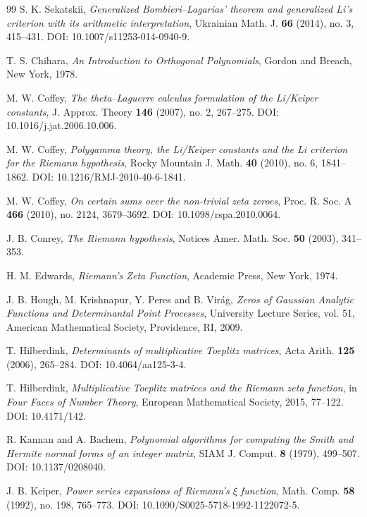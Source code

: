 \documentclass[11pt]{amsart}
\numberwithin{equation}{section}
\theoremstyle{plain}
\theoremstyle{definition}
\theoremstyle{remark}
\begin{document}
\begin{thebibliography}{99}
S. K. Sekatskii,
\emph{Generalized Bombieri--Lagarias' theorem and generalized Li's criterion with its arithmetic interpretation},
Ukrainian Math. J. \textbf{66} (2014), no. 3, 415--431.
DOI: 10.1007/s11253-014-0940-9.

T. S. Chihara,
\emph{An Introduction to Orthogonal Polynomials},
Gordon and Breach, New York, 1978.

M. W. Coffey,
\emph{The theta--Laguerre calculus formulation of the Li/Keiper constants},
J. Approx. Theory \textbf{146} (2007), no. 2, 267--275.
DOI: 10.1016/j.jat.2006.10.006.

M. W. Coffey,
\emph{Polygamma theory, the Li/Keiper constants and the Li criterion for the Riemann hypothesis},
Rocky Mountain J. Math. \textbf{40} (2010), no. 6, 1841--1862.
DOI: 10.1216/RMJ-2010-40-6-1841.

M. W. Coffey,
\emph{On certain sums over the non-trivial zeta zeroes},
Proc. R. Soc. A \textbf{466} (2010), no. 2124, 3679--3692.
DOI: 10.1098/rspa.2010.0064.

J. B. Conrey,
\emph{The Riemann hypothesis},
Notices Amer. Math. Soc. \textbf{50} (2003), 341--353.

H. M. Edwards,
\emph{Riemann's Zeta Function},
Academic Press, New York, 1974.

J. B. Hough, M. Krishnapur, Y. Peres and B. Vir\'ag,
\emph{Zeros of Gaussian Analytic Functions and Determinantal Point Processes},
University Lecture Series, vol. 51, American Mathematical Society, Providence, RI, 2009.

T. Hilberdink,
\emph{Determinants of multiplicative Toeplitz matrices},
Acta Arith. \textbf{125} (2006), 265--284.
DOI: 10.4064/aa125-3-4.

T. Hilberdink,
\emph{Multiplicative Toeplitz matrices and the Riemann zeta function},
in \emph{Four Faces of Number Theory}, European Mathematical Society, 2015, 77--122.
DOI: 10.4171/142.

R. Kannan and A. Bachem,
\emph{Polynomial algorithms for computing the Smith and Hermite normal forms of an integer matrix},
SIAM J. Comput. \textbf{8} (1979), 499--507.
DOI: 10.1137/0208040.

J. B. Keiper,
\emph{Power series expansions of Riemann's $\xi$ function},
Math. Comp. \textbf{58} (1992), no. 198, 765--773.
DOI: 10.1090/S0025-5718-1992-1122072-5.


\end{thebibliography}
\end{document}
